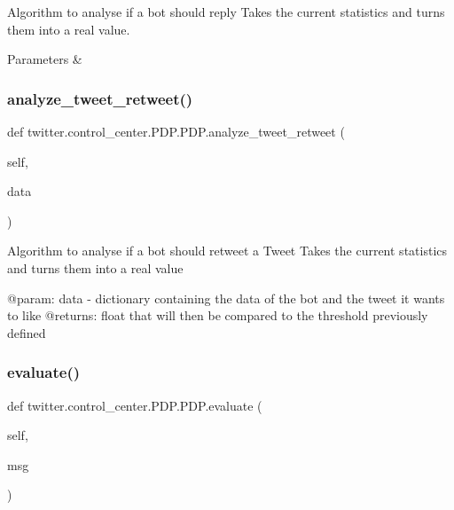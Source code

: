 Algorithm to analyse if a bot should reply Takes the current statistics and turns them into a real value. 


\begin{DoxyParams}{Parameters}
{\em } & \\
\hline
\end{DoxyParams}
\mbox{\label{classtwitter_1_1control__center_1_1PDP_1_1PDP_ae173efc2c97b103ad0fbb0484c27835a}} 
\subsubsection{\texorpdfstring{analyze\+\_\+tweet\+\_\+retweet()}{analyze\_tweet\_retweet()}}
{\footnotesize\ttfamily def twitter.\+control\+\_\+center.\+P\+D\+P.\+P\+D\+P.\+analyze\+\_\+tweet\+\_\+retweet (\begin{DoxyParamCaption}\item[{}]{self,  }\item[{}]{data }\end{DoxyParamCaption})}

\begin{DoxyVerb}Algorithm to analyse if a bot should retweet a Tweet
Takes the current statistics and turns them into a real value

@param: data - dictionary containing the data of the bot and the tweet it wants to like
@returns: float that will then be compared to the threshold previously defined
\end{DoxyVerb}
 \mbox{\label{classtwitter_1_1control__center_1_1PDP_1_1PDP_ad40264a760a1bdcb7563cb71955bb7f9}} 
\subsubsection{\texorpdfstring{evaluate()}{evaluate()}}
{\footnotesize\ttfamily def twitter.\+control\+\_\+center.\+P\+D\+P.\+P\+D\+P.\+evaluate (\begin{DoxyParamCaption}\item[{}]{self,  }\item[{}]{msg }\end{DoxyParamCaption})}



